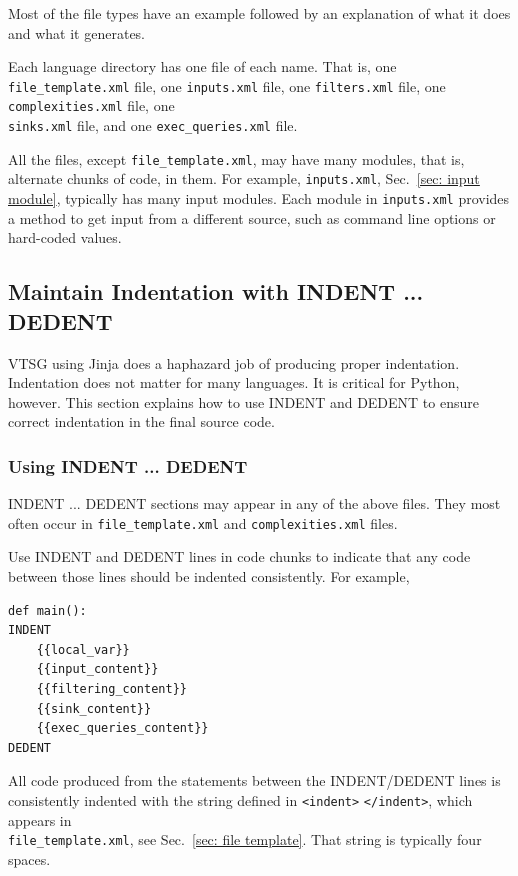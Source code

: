 Most of the file types have an example followed by
an explanation of what it does and what it generates.

Each language directory has one file of each name. That is,
one \verb|file_template.xml| file, one \verb|inputs.xml| file,
one \verb|filters.xml| file, one \verb|complexities.xml| file,
one \\ \verb|sinks.xml| file, and one \verb|exec_queries.xml| file.

All the files, except \verb|file_template.xml|, may have many
modules, that is, alternate chunks of code, in them.
For example, \verb|inputs.xml|, Sec.~\ref{sec: input module}, typically has many input
modules.  Each module in \verb|inputs.xml| provides a method to get input from a
different source, such as command line options or hard-coded values.

\subsection{Maintain Indentation with INDENT ... DEDENT}
\label{sec:indent}

VTSG using Jinja does a haphazard job of producing proper indentation.  Indentation
does not matter for many languages.  It is critical for Python, however.  This
section explains how to use INDENT and DEDENT to ensure correct indentation in the
final source code.

\subsubsection{Using INDENT ... DEDENT}
INDENT ... DEDENT sections may appear in any of the above files.  They
most often occur in \verb|file_template.xml| and \verb|complexities.xml| files.

Use INDENT and DEDENT lines in code chunks to indicate that
any code between those lines should be indented consistently.  For example,
\begin{verbatim}
def main():
INDENT
    {{local_var}}
    {{input_content}}
    {{filtering_content}}
    {{sink_content}}
    {{exec_queries_content}}
DEDENT
\end{verbatim}
All code produced from the statements between the INDENT/DEDENT lines is
consistently indented with the string defined in \verb|<indent>| \verb|</indent>|,
which appears in \\ \verb|file_template.xml|, see Sec.~\ref{sec: file template}.
That string is typically four spaces.

